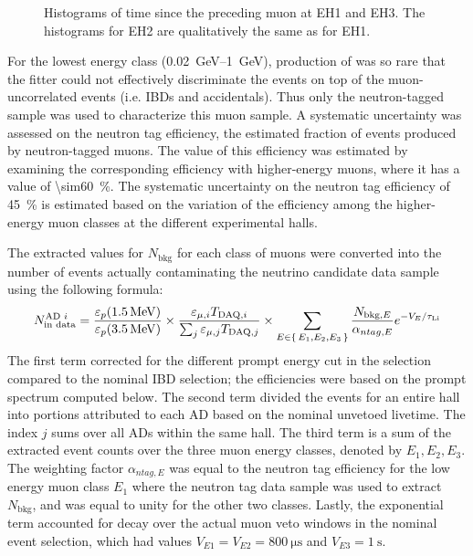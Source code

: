 \begin{figure}
    \caption{
        Histograms of time since the preceding muon
        at EH1 and EH3.
        The histograms for EH2 are qualitatively the same as for EH1.
    }
    \label{fig:li9_fits}
\end{figure}

For the lowest energy class (\SIrange{0.02}{1}{\GeV}),
production of \li{} was so rare that the fitter
could not effectively discriminate the \li{} events
on top of the muon-uncorrelated events (i.e. IBDs and accidentals).
Thus only the neutron-tagged sample was used to characterize this muon sample.
A systematic uncertainty was assessed on the neutron tag efficiency,
the estimated fraction of \li{} events produced by neutron-tagged muons.
The value of this efficiency was estimated by examining
the corresponding efficiency with higher-energy muons,
where it has a value of \SI{\sim60}{\percent}.
The systematic uncertainty on the neutron tag efficiency of \SI{45}{\percent}
is estimated  based on the variation of the efficiency
among the higher-energy muon classes at the different experimental halls.

The extracted values for $N_\text{bkg}$ for each class of muons
were converted into the number of \li{} events
actually contaminating the neutrino candidate data sample
using the following formula:
\begin{equation}\label{eq:li9_rate_conv}
    N_\text{in data}^{\text{AD }i} =
    \frac{\varepsilon_p(\SI{1.5}{\MeV})}{\varepsilon_p(\SI{3.5}{\MeV})}
    \times
    \frac{\varepsilon_{\mu,i} T_{\text{DAQ},i}}{
        \sum_j \varepsilon_{\mu,j} T_{\text{DAQ},j}
    }
    \times
    \sum_{E\in\set{E_1,E_2,E_3}}
    \frac{N_{\text{bkg},E}}{\alpha_{ntag, E}} e^{-V_E/\tau_{\text{Li}}}
\end{equation}
The first term corrected for the different prompt energy cut
in the \li{} selection compared to the nominal IBD selection;
the efficiencies were based on the \li{} prompt spectrum computed below.
The second term divided the events for an entire hall
into portions attributed to each AD based on the nominal unvetoed livetime.
The index $j$ sums over all ADs within the same hall.
The third term is a sum of the extracted event counts
over the three muon energy classes, denoted by $E_1,E_2,E_3$.
The weighting factor $\alpha_{ntag,E}$ was equal to
the neutron tag efficiency for the low energy muon class $E_1$
where the neutron tag data sample was used to extract $N_\text{bkg}$,
and was equal to unity for the other two classes.
Lastly, the exponential term accounted for \li{} decay
over the actual muon veto windows in the nominal event selection,
which had values $V_{E1} = V_{E2} = \SI{800}{\us}$
and $V_{E3} = \SI{1}{\s}$.

